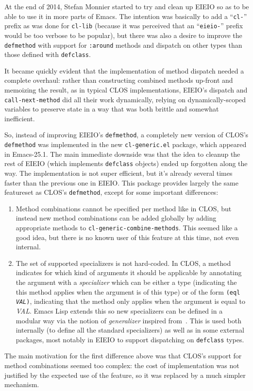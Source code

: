 \documentclass[format=acmsmall, review]{acmart}
\newcommand \Elisp {Emacs Lisp}
\newcommand \id[1] {\textrm{\textsl{#1}}}
\begin{document}
At the end of 2014, Stefan Monnier started to try and clean up EIEIO so as
to be able to use it in more parts of Emacs.  The intention was basically to
add a ``\texttt{cl-}'' prefix as was done for \texttt{cl-lib} (because it
was perceived that an ``\texttt{eieio-}'' prefix would be too verbose to be
popular), but there was also a desire to improve the \texttt{defmethod} with
support for \texttt{:around} methods and dispatch on other types than those
defined with \texttt{defclass}.

It became quickly evident that the implementation of method dispatch
needed a complete overhaul: rather than constructing combined methods
up-front and memoizing the result, as in typical CLOS implementations,
EIEIO's dispatch and \texttt{call-next-method} did all their work
dynamically, relying on dynamically-scoped variables to preserve state in
a way that was both brittle and somewhat inefficient.

So, instead of improving EIEIO's \texttt{defmethod}, a completely new
version of CLOS's \texttt{defmethod} was implemented in the new
\texttt{cl-generic.el} package, which appeared in Emacs-25.1.  The main
immediate downside was that the idea to cleanup the rest of EIEIO (which
implements \texttt{defclass} objects) ended up forgotten along the way.
The implementation is not super efficient, but it's already several times
faster than the previous one in EIEIO.  This package provides largely the
same featureset as CLOS's \texttt{defmethod}, except for some important
differences:
\begin{enumerate}
\item Method combinations cannot be specified per method like in CLOS, but
  instead new method combinations can be added globally by adding
  appropriate methods to
  \texttt{cl-\linebreak[0]generic-\linebreak[0]combine-\linebreak[0]methods}.
  This seemed like a good idea, but there is no known user of this feature
  at this time, not even internal.
\item The set of supported specializers is not hard-coded.  In CLOS,
  a method indicates for which kind of arguments it should be applicable by
  annotating the argument with a \emph{specializer} which can be
  either a type (indicating the this method applies when the argument is of
  this type) or of the form \texttt{(eql \id{VAL})}, indicating that the
  method only applies when the argument is equal to \id{VAL}.
  \Elisp{} extends this so new specializers
  can be defined in a modular way via the notion of \emph{generalizer}
  inspired from~\cite{Rhodes14}.  This is used both internally (to define
  all the standard specializers) as well as in some external packages, most
  notably in EIEIO to support dispatching on \texttt{defclass} types.
\end{enumerate}
The main motivation for the first difference above was that CLOS's support
for method combinations seemed too complex: the cost of implementation was
not justified by the expected use of the feature, so it was replaced by
a much simpler mechanism.
\end{document}
